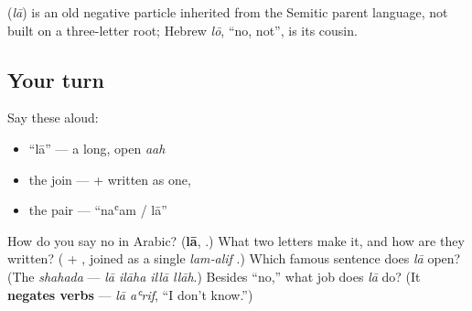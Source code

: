 \begin{cousinweb}
\textbf{} (\emph{lā}) is an old negative particle inherited from the Semitic parent language, not built on a three-letter root; Hebrew \emph{lō}, \textquotedblleft{}no, not\textquotedblright{}, is its cousin.
\end{cousinweb}

\subsection*{Your turn}
Say these aloud:

\begin{itemize}
\raggedright
  \item \textquotedblleft{}lā\textquotedblright{} — a long, open \emph{aah}
  \item the join —  +  written as one, 
  \item the pair — \textquotedblleft{}naʿam / lā\textquotedblright{}
\end{itemize}

\begin{tcolorbox}[breakable,colback=teal!4,colframe=teal!35!black,title={Before you move on}]
How do you say no in Arabic? (\textbf{lā}, .) What two letters make it, and how are they written? (\textbf{} + \textbf{}, joined as a single \emph{lam‑alif} .) Which famous sentence does \emph{lā} open? (The \emph{shahada} — \emph{lā ilāha illā llāh}.) Besides \textquotedblleft{}no,\textquotedblright{} what job does \emph{lā} do? (It \textbf{negates verbs} — \emph{lā aʿrif}, \textquotedblleft{}I don't know.\textquotedblright{})
\end{tcolorbox}
